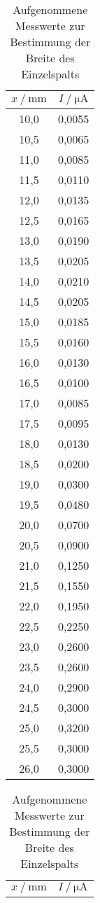 \begin{table}[H]
   \centering
   \caption{Aufgenommene Messwerte zur Bestimmung der Breite des Einzelspalts} 
   \label{tab:ein}
   \begin{tabular}[t]{ c c }
 \toprule
 {$x\:/\: \mathrm{mm}$} & {$I\:/\: \mathrm{μA}$} \\
    \midrule
    10,0 & 0,0055 \\
    10,5 & 0,0065 \\
    11,0 & 0,0085 \\
    11,5 & 0,0110 \\
    12,0 & 0,0135 \\
    12,5 & 0,0165 \\
    13,0 & 0,0190 \\
    13,5 & 0,0205 \\
    14,0 & 0,0210 \\
    14,5 & 0,0205 \\
    15,0 & 0,0185 \\
    15,5 & 0,0160 \\
    16,0 & 0,0130 \\
    16,5 & 0,0100 \\
    17,0 & 0,0085 \\
    17,5 & 0,0095 \\
    18,0 & 0,0130 \\
    18,5 & 0,0200 \\
    19,0 & 0,0300 \\
    19,5 & 0,0480 \\
    20,0 & 0,0700 \\
    20,5 & 0,0900 \\
    21,0 & 0,1250 \\
    21,5 & 0,1550 \\
    22,0 & 0,1950 \\
    22,5 & 0,2250 \\
    23,0 & 0,2600 \\
    23,5 & 0,2600 \\
    24,0 & 0,2900 \\
    24,5 & 0,3000 \\
    25,0 & 0,3200 \\
    25,5 & 0,3000 \\
    26,0 & 0,3000 \\
    \bottomrule
  \end{tabular}
    \qquad
  \begin{tabular}[t]{c c}
    \toprule
    {$x\:/\: \mathrm{mm}$} & {$I\:/\: \mathrm{μA}$} \\

\end{tabular}
\end{table}
